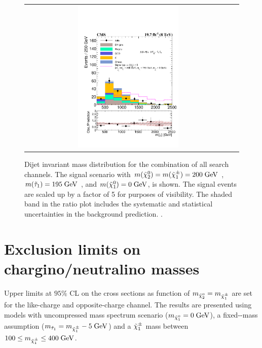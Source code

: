\begin{figure}[tbh!]
	\centering
	\begin{tabular}{cc}
		\includegraphics[width=0.50\textwidth]{PLOTS/CMS-SUS-14-005_Figure_005.pdf}
	\end{tabular}
	\caption{Dijet invariant mass distribution for the combination of all search channels. The signal scenario with $m(\tilde{\chi}^{0}_{2})= m(\tilde{\chi}^{\pm}_{1}) =  200\;\text{Ge}\kern-0.06667em\text{V}$ , $m(\tilde{\tau}_{1})= 195\;\text{Ge}\kern-0.06667em\text{V}$ , and $m(\tilde{\chi}^{0}_{1}) = 0\;\text{Ge}\kern-0.06667em\text{V}$, is shown. The signal events are scaled up by a factor of 5 for purposes of visibility. The shaded band in the ratio plot includes the systematic and statistical uncertainties in the background prediction. \cite{Khachatryan:2015kxa}.}
	\label{fig::mjj_combined_allchannels}
\end{figure} 

\clearpage

\section{Exclusion limits on chargino/neutralino masses}
\FloatBarrier

Upper limits at $95\%$ CL on the cross sections as function of $m_{\tilde{\chi}^{0}_{2}}=m_{\tilde{\chi}^{\pm}_{1}}$ are set for the \hadtau\hadtau like-charge and opposite-charge channel. The results are presented using models with uncompressed mass spectrum scenario ($m_{\tilde{\chi}^{0}_{1}} = 0\;\text{Ge}\kern-0.06667em\text{V}$), a fixed-\stau-mass assumption ($m_{\tilde{\tau}_{1}} =  m_{\tilde{\chi}^{\pm}_{1}} - 5\;\text{Ge}\kern-0.06667em\text{V}$) and
a $\tilde{\chi}^{\pm}_{1}$ mass between $100 \leq m_{\tilde{\chi}^{\pm}_{1}} \leq 400\;\text{Ge}\kern-0.06667em\text{V}$.

